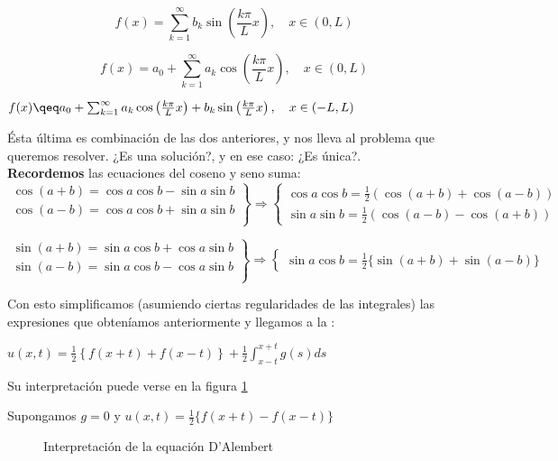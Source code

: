 		\[ f(x) = \sum_{k=1}^{\infty} b_k \sin \left( \frac{k \pi}{L} x \right), \quad x \in (0,L) \]

		\[ f(x) = a_0 + \sum^{\infty}_{k=1} a_k \cos \left( \frac{k \pi}{L} x \right), \quad x \in (0,L) \]

		\(
		f(x) \qeq a_0 + \sum^{\infty}_{k=1} a_k \cos \left( \frac{k \pi}{L} x \right) + b_k \sin \left( \frac{k \pi}{L} x \right), \quad x \in (-L,L)
		\)

		Ésta última es combinación de las dos anteriores, y nos lleva al problema que queremos resolver. ¿Es una solución?, y en ese caso: ¿Es única?.\\

		\textbf{Recordemos} las ecuaciones del coseno y seno suma:
		\[
		\left. \begin{array}{r}
			\cos (a + b) = \cos a \cos b - \sin a \sin b \\
			\cos (a - b) = \cos a \cos b + \sin a \sin b \\
		\end{array} \right\} \Rightarrow \left\{ \begin{array}{l}
			\cos a \cos b = \frac{1}{2} (\cos (a+b) + \cos (a-b)) \\
			\sin a \sin b = \frac{1}{2} (\cos (a-b) - \cos (a+b))
		\end{array} \right.
		\]

		\[
		\left. \begin{array}{r}
			\sin (a + b) = \sin a \cos b + \cos a \sin b \\
			\sin (a - b) = \sin a \cos b - \cos a \sin b \\
		\end{array} \right\} \Rightarrow \left\{ \begin{array}{l}
			\sin a \cos b = \frac{1}{2} \{\sin (a+b) + \sin(a-b)\}
		\end{array} \right.
		\]

		Con esto simplificamos (asumiendo ciertas regularidades de las integrales) las expresiones que obteníamos anteriormente y llegamos a la :

		\(
		u(x,t) = \frac{1}{2} \left\{ f(x+t) + f(x-t) \right\} + \frac{1}{2} \int^{x+t}_{x-t} g(s) ds  \label{eq:DALEMBERT}\)

		Su interpretación puede verse en la figura \ref{fig:interpretacionDalembert}

		Supongamos $g=0$ y $u(x,t) = \frac{1}{2} \{ f(x+t) - f(x-t)\} $

		\begin{figure}[thbp]
		\centering
		\caption{Interpretación de la equación D'Alembert}
		\label{fig:interpretacionDalembert}
		\end{figure}

